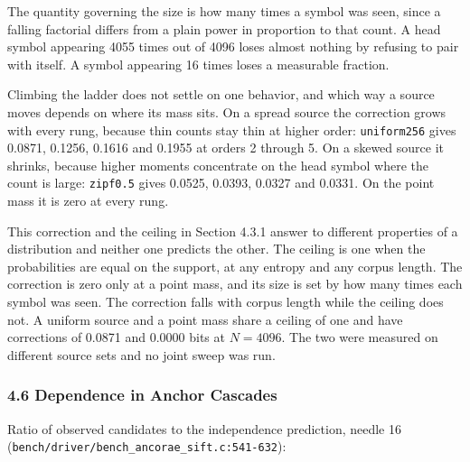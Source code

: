 The quantity governing the size is how many times a symbol was seen, since a falling factorial differs from a plain power in proportion to that count. A head symbol appearing 4055 times out of 4096 loses almost nothing by refusing to pair with itself. A symbol appearing 16 times loses a measurable fraction.

Climbing the ladder does not settle on one behavior, and which way a source moves depends on where its mass sits. On a spread source the correction grows with every rung, because thin counts stay thin at higher order: \texttt{uniform256} gives 0.0871, 0.1256, 0.1616 and 0.1955 at orders 2 through 5. On a skewed source it shrinks, because higher moments concentrate on the head symbol where the count is large: \texttt{zipf0.\allowbreak{}5} gives 0.0525, 0.0393, 0.0327 and 0.0331. On the point mass it is zero at every rung.

This correction and the ceiling in Section 4.3.1 answer to different properties of a distribution and neither one predicts the other. The ceiling is one when the probabilities are equal on the support, at any entropy and any corpus length. The correction is zero only at a point mass, and its size is set by how many times each symbol was seen. The correction falls with corpus length while the ceiling does not. A uniform source and a point mass share a ceiling of one and have corrections of 0.0871 and 0.0000 bits at \(N = 4096\). The two were measured on different source sets and no joint sweep was run.

\subsubsection{4.6 Dependence in Anchor Cascades}

Ratio of observed candidates to the independence prediction, needle 16 (\texttt{bench/\allowbreak{}driver/\allowbreak{}bench\_\allowbreak{}ancorae\_\allowbreak{}sift.\allowbreak{}c:541-\allowbreak{}632}):

